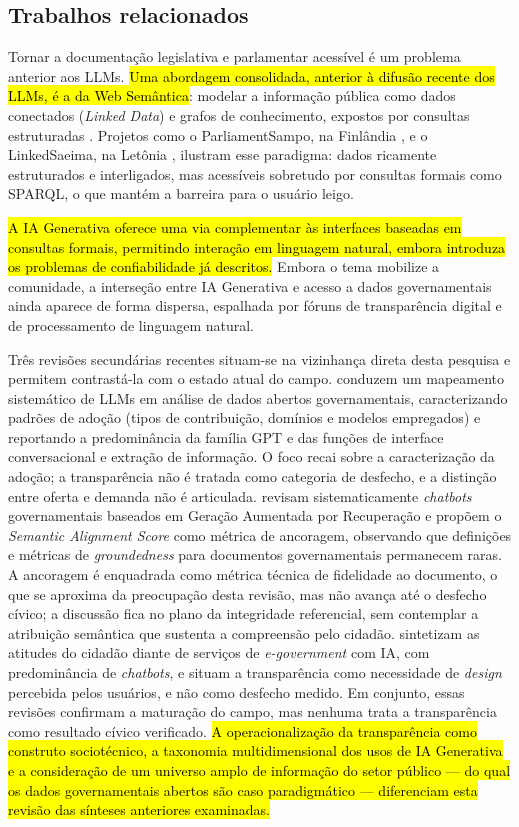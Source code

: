 \documentclass[brazilian]{sbc2025}
\newif\ifhl \hltrue
\newcommand{\rev}[1]{\ifhl\sethlcolor{yellow}\hl{#1}\else#1\fi}
\begin{document}
\subsection{Trabalhos relacionados}
\label{subsec:bg_related}

Tornar a documentação legislativa e parlamentar acessível é um problema anterior aos LLMs. \rev{Uma abordagem consolidada, anterior à difusão recente dos LLMs, é a da Web Semântica}: modelar a informação pública como dados conectados (\emph{Linked Data}) e grafos de conhecimento, expostos por consultas estruturadas \citep{IsotaniBittencourt2015}. Projetos como o ParliamentSampo, na Finlândia \citep{Tamper2022}, e o LinkedSaeima, na Letônia \citep{Bojars2019}, ilustram esse paradigma: dados ricamente estruturados e interligados, mas acessíveis sobretudo por consultas formais como SPARQL, o que mantém a barreira para o usuário leigo.

\rev{A IA Generativa oferece uma via complementar às interfaces baseadas em consultas formais, permitindo interação em linguagem natural, embora introduza os problemas de confiabilidade já descritos.} Embora o tema mobilize a comunidade, a interseção entre IA Generativa e acesso a dados governamentais ainda aparece de forma dispersa, espalhada por fóruns de transparência digital e de processamento de linguagem natural.

Três revisões secundárias recentes situam-se na vizinhança direta desta pesquisa e permitem contrastá-la com o estado atual do campo. \citet{Bastos2025} conduzem um mapeamento sistemático de LLMs em análise de dados abertos governamentais, caracterizando padrões de adoção (tipos de contribuição, domínios e modelos empregados) e reportando a predominância da família GPT e das funções de interface conversacional e extração de informação. O foco recai sobre a caracterização da adoção; a transparência não é tratada como categoria de desfecho, e a distinção entre oferta e demanda não é articulada. \citet{Widiyaningtyas2026} revisam sistematicamente \textit{chatbots} governamentais baseados em Geração Aumentada por Recuperação e propõem o \emph{Semantic Alignment Score} como métrica de ancoragem, observando que definições e métricas de \textit{groundedness} para documentos governamentais permanecem raras. A ancoragem é enquadrada como métrica técnica de fidelidade ao documento, o que se aproxima da preocupação desta revisão, mas não avança até o desfecho cívico; a discussão fica no plano da integridade referencial, sem contemplar a atribuição semântica que sustenta a compreensão pelo cidadão. \citet{Savveli2025} sintetizam as atitudes do cidadão diante de serviços de \textit{e-government} com IA, com predominância de \textit{chatbots}, e situam a transparência como necessidade de \textit{design} percebida pelos usuários, e não como desfecho medido. Em conjunto, essas revisões confirmam a maturação do campo, mas nenhuma trata a transparência como resultado cívico verificado. \rev{A operacionalização da transparência como construto sociotécnico, a taxonomia multidimensional dos usos de IA Generativa e a consideração de um universo amplo de informação do setor público --- do qual os dados governamentais abertos são caso paradigmático --- diferenciam esta revisão das sínteses anteriores examinadas.}
\end{document}

